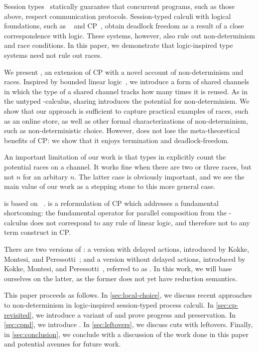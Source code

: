 \documentclass[envcountsame,UKenglish]{llncs}
\begin{document}
Session types~\cite{honda1993} statically guarantee that concurrent programs, such as those above, respect communication protocols. Session-typed calculi with logical foundations, such as \piDILL~\cite{caires2010} and CP~\cite{wadler2012}, obtain deadlock freedom as a result of a close correspondence with logic. These systems, however, also rule out non-determinism and race conditions. In this paper, we demonstrate that logic-inspired type systems need not rule out races.

We present \nodcap, an extension of CP with a novel account of non-determinism and races. Inspired by bounded linear logic~\cite{girard1992}, we introduce a form of shared channels in which the type of a shared channel tracks how many times it is reused. As in the untyped \textpi-calculus, sharing introduces the potential for non-determinism. We show that our approach is sufficient to capture practical examples of races, such as an online store, as well as other formal characterizations of non-determinism, such as non-deterministic choice.  However, \nodcap does not lose the meta-theoretical benefits of CP: we show that it enjoys termination and deadlock-freedom.

An important limitation of our work is that types in \nodcap explicitly count the potential races on a channel.  It works fine when there are two or three races, but not $n$ for an arbitary $n$.  The latter case is obviously important, and we see the main value of our work as a stepping stone to this more general case.

\nodcap is based on \dhcp~\cite{kokke2018tlla,kokke2019pacmpl}. \dhcp is a reformulation of CP which addresses a fundamental shortcoming: the fundamental operator for parallel composition from the \textpi-calculus does not correspond to any rule of linear logic, and therefore not to any term construct in CP.

There are two versions of \dhcp: a version with delayed actions, introduced by Kokke, Montesi, and Peressotti~\cite{kokke2019pacmpl}; and a version without delayed actions, introduced by Kokke, Montesi, and Peressotti~\cite{kokke2018tlla}, referred to as \hcp. In this work, we will base ourselves on the latter, as the former does not yet have reduction semantics.

This paper proceeds as follows. In \cref{sec:local-choice}, we discuss recent approaches to non-determinism in logic-inspired session-typed process calculi. In \cref{sec:cp-revisited}, we introduce a variant of \cp and prove progress and preservation. In \cref{sec:cpnd}, we introduce \nodcap. In \cref{sec:leftovers}, we discuss cuts with leftovers. Finally, in \cref{sec:conclusion}, we conclude with a discussion of the work done in this paper and potential avenues for future work.
\end{document}
